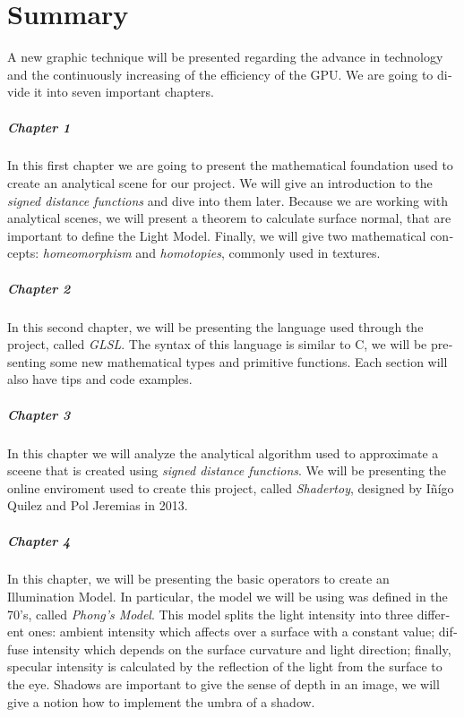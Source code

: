 \cleardoublepage

\chapter*{Summary}

\begin{otherlanguage}{english}
A new graphic technique will be presented regarding the advance in technology and the continuously increasing of the efficiency of the GPU. We are going to divide it into seven important chapters.

\paragraph{Chapter 1} In this first chapter we are going to present the mathematical foundation used to create an analytical scene for our project. We will give an introduction to the \textit{signed distance functions} and dive into them later. Because we are working with analytical scenes, we will present a theorem to calculate surface normal, that are important to define the Light Model. Finally, we will give two mathematical concepts: \textit{homeomorphism} and \textit{homotopies}, commonly used in textures.

\paragraph{Chapter 2} In this second chapter, we will be presenting the language used through the project, called \textit{GLSL}. The syntax of this language is similar to C, we will be presenting some new mathematical types and primitive functions. Each section will also have tips and code examples.

\paragraph{Chapter 3} In this chapter we will analyze the analytical algorithm used to approximate a sceene that is created using \textit{signed distance functions}. We will be presenting the online enviroment used to create this project, called \textit{Shadertoy}, designed by Iñígo Quilez and Pol Jeremias in 2013.

\paragraph{Chapter 4} In this chapter, we will be presenting the basic operators to create an Illumination Model. In particular, the model we will be using was defined in the 70's, called \textit{Phong's Model}. This model splits the light intensity into three different ones: ambient intensity which affects over a surface with a constant value; diffuse intensity which depends on the surface curvature and light direction; finally, specular intensity is calculated by the reflection of the light from the surface to the eye. Shadows are important to give the sense of depth in an image, we will give a notion how to implement the umbra of a shadow.


\end{otherlanguage}
